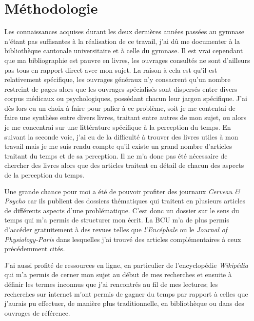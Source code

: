 \documentclass[12pt,fleqn,oneside,french,openany]{book} %
\begin{document}
\section{Méthodologie} \label{sec:methodologie}
Les connaissances acquises durant les deux dernières années passées au gymnase n'étant pas suffisantes à la réalisation de ce travail, j'ai dû me documenter à la bibliothèque cantonale universitaire et à celle du gymnase. Il est vrai cependant que ma bibliographie est pauvre en livres, les ouvrages consultés ne sont d'ailleurs pas tous en rapport direct avec mon sujet. La raison à cela est qu'il est relativement spécifique, les ouvrages généraux n'y consacrent qu'un nombre restreint de pages alors que les ouvrages spécialisés sont dispersés entre divers corpus médicaux ou psychologiques, possédant chacun leur jargon spécifique. J'ai dès lors eu un choix à faire pour palier à ce problème, soit je me contentai de faire une synthèse entre divers livres, traitant entre autres de mon sujet, ou alors je me concentrai sur une littérature spécifique à la perception du temps. En suivant la seconde voie, j'ai eu de la difficulté à trouver des livres utiles à mon travail mais je me suis rendu compte qu'il existe un grand nombre d'articles traitant du temps et de sa perception. Il ne m'a donc pas été nécessaire de chercher des livres alors que des articles traitent en détail de chacun des aspects de la perception du temps.

Une grande chance pour moi a été de pouvoir profiter des journaux \emph{Cerveau \& Psycho} car ils publient des dossiers thématiques qui traitent en plusieurs articles de différents aspects d'une problématique. C'est donc un dossier sur le sens du temps qui m'a permis de structurer mon écrit. 
La BCU m'a de plus permis d'accéder gratuitement à des revues telles que \emph{l'Encéphale} ou le \emph{Journal of Physiology-Paris} dans lesquelles j'ai trouvé des articles complémentaires à ceux précédemment cités. 

J'ai aussi profité de ressources en ligne, en particulier de l'encyclopédie \textit{Wikipédia} qui m'a permis de cerner mon sujet au début de mes recherches et ensuite à définir les termes inconnus que j'ai rencontrés au fil de mes lectures; les recherches sur internet m'ont permis de gagner du temps par rapport à celles que j'aurais pu effectuer, de manière plus traditionnelle, en bibliothèque ou dans des ouvrages de référence.
\end{document}
